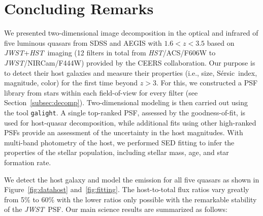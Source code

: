 \documentclass[twocolumn,]{aastex631}
\newcommand{\sersic}{S\'ersic}
\newcommand{\galight}{\texttt{galight}}
\newcommand{\hst}{{\it HST}}
\newcommand{\jwst}{{\it JWST}}
\begin{document}
\section{Concluding Remarks}\label{sec:conclusion}

We presented two-dimensional image decomposition in the optical and infrared of five luminous quasars from SDSS and AEGIS with $1.6<z<3.5$ based on \jwst+\hst\ imaging (12 filters in total from \hst/ACS/F606W to \jwst/NIRCam/F444W) provided by the CEERS collaboration. Our purpose is to detect their host galaxies and measure their properties (i.e., size, \sersic\ index, magnitude, color) for the first time beyond $z>3$. For this, we constructed a PSF library from stars within each field-of-view for every filter (see Section~\ref{subsec:decomp}). Two-dimensional modeling is then carried out using the tool \galight. A single top-ranked PSF, assessed by the goodness-of-fit, is used for host-quasar decomposition, while additional fits using other high-ranked PSFs provide an assessment of the uncertainty in the host magnitudes. With multi-band photometry of the host, we performed SED fitting to infer the properties of the stellar population, including stellar mass, age, and star formation rate.

We detect the host galaxy and model the emission for all five quasars as shown in Figure~\ref{fig:datahost} and~\ref{fig:fitting}. The host-to-total flux ratios vary greatly from 5\% to 60\% with the lower ratios only possible with the remarkable stability of the \jwst\ PSF. Our main science results are summarized as follows:
\end{document}
